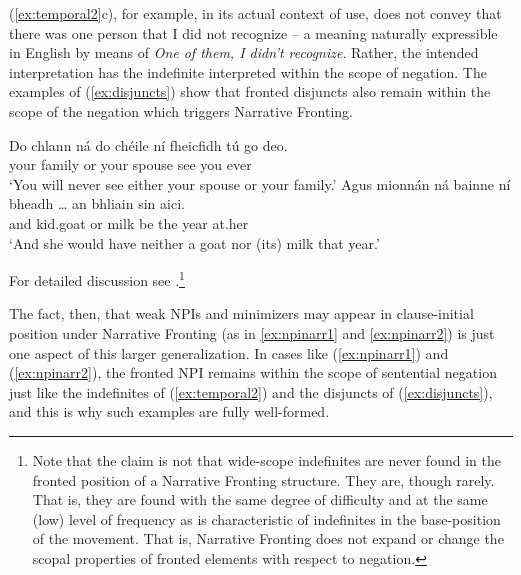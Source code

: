 \documentclass[output=paper,colorlinks,citecolor=brown]{langscibook}
\begin{document}
\noindent (\ref{ex:temporal2}c), for example, in its actual context of use, does not convey that there was one person that I did not recognize -- a meaning naturally expressible in English by means of {\itshape One of them, I didn't recognize}. Rather, the intended interpretation has the indefinite interpreted within the scope of negation.  The examples of (\ref{ex:disjuncts}) show that fronted disjuncts also remain within the scope of the negation which triggers Narrative Fronting.

\ea\label{ex:disjuncts}
\ea
\gll Do chlann ná do chéile ní fheicfidh tú {go deo}. \\
     your family or your spouse {\no} {see\fut} you ever \\
\glt `You will never see either your spouse or your family.'
\ex
\gll Agus mionnán ná bainne ní bheadh {\ldots} an bhliain sin aici. \\
    and  kid.goat or milk {\no} {be\cond} {} the year {\seo} at.her \\
\glt `And she would have neither a goat nor (its) milk that year.'
\z
\z


\noindent For detailed discussion see \citet{mccloskey:96a}.\footnote{Note that the claim is not that wide-scope indefinites are never found in the fronted position of a Narrative Fronting structure. They are, though rarely. That is, they are found with the same degree of difficulty and at the same (low) level of frequency as is characteristic of indefinites in the base-position of the movement. That is, Narrative Fronting does not expand or change the scopal properties of fronted elements with respect to negation.}

The fact, then, that weak NPIs and minimizers may appear in clause-initial position under Narrative Fronting (as in \ref{ex:npinarr1} and \ref{ex:npinarr2}) is just one aspect of this larger generalization. In cases like (\ref{ex:npinarr1}) and (\ref{ex:npinarr2}), the fronted NPI remains within the scope of sentential negation just like the indefinites of (\ref{ex:temporal2}) and the disjuncts of (\ref{ex:disjuncts}), and this is why such examples are fully well-formed.
\end{document}
